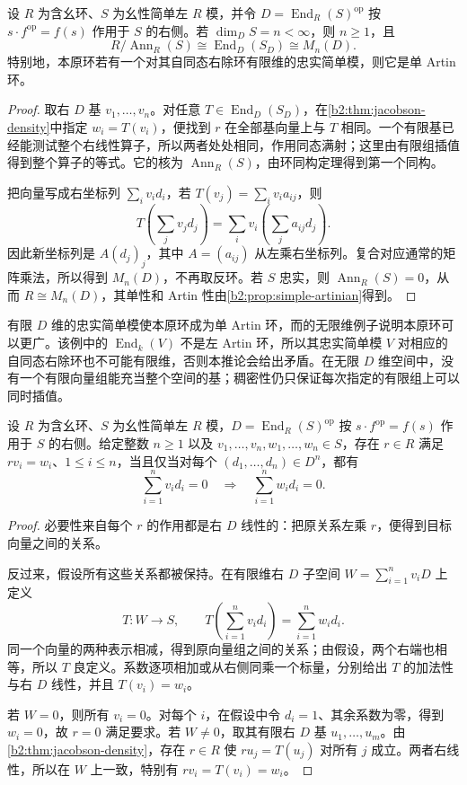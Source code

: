 \begin{corollary}\label{b2:cor:density-finite-dimensional}
	设 \(R\) 为含幺环、\(S\) 为幺性简单左 \(R\) 模，并令 \(D=\operatorname{End}_R(S)^{\mathrm{op}}\) 按 \(s\cdot f^{\mathrm{op}}=f(s)\) 作用于 \(S\) 的右侧。若 \(\dim_D S=n<\infty\)，则 \(n\ge1\)，且
	\[
		R/\operatorname{Ann}_R(S)\cong\operatorname{End}_D(S_D)\cong M_n(D).
	\]
	特别地，本原环若有一个对其自同态右除环有限维的忠实简单模，则它是单 Artin 环。
\end{corollary}
\begin{proof}
	取右 \(D\) 基 \(v_1,\ldots,v_n\)。对任意 \(T\in\operatorname{End}_D(S_D)\)，在\cref{b2:thm:jacobson-density}中指定 \(w_i=T(v_i)\)，便找到 \(r\) 在全部基向量上与 \(T\) 相同。一个有限基已经能测试整个右线性算子，所以两者处处相同，作用同态满射；这里由有限组插值得到整个算子的等式。它的核为 \(\operatorname{Ann}_R(S)\)，由环同构定理得到第一个同构。

	把向量写成右坐标列 \(\sum_i v_i d_i\)，若 \(T(v_j)=\sum_i v_i a_{ij}\)，则
	\[
		T\left(\sum_jv_jd_j\right) =\sum_iv_i\left(\sum_ja_{ij}d_j\right).
	\]
	因此新坐标列是 \(A(d_j)_j\)，其中 \(A=(a_{ij})\) 从左乘右坐标列。复合对应通常的矩阵乘法，所以得到 \(M_n(D)\)，不再取反环。若 \(S\) 忠实，则 \(\operatorname{Ann}_R(S)=0\)，从而 \(R\cong M_n(D)\)，其单性和 Artin 性由\cref{b2:prop:simple-artinian}得到。
\end{proof}

有限 \(D\) 维的忠实简单模使本原环成为单 Artin 环，而的无限维例子说明本原环可以更广。该例中的 \(\operatorname{End}_k(V)\) 不是左 Artin 环，所以其忠实简单模 \(V\) 对相应的自同态右除环也不可能有限维，否则本推论会给出矛盾。在无限 \(D\) 维空间中，没有一个有限向量组能充当整个空间的基；稠密性仍只保证每次指定的有限组上可以同时插值。

\begin{corollary}\label{b2:cor:density-compatible-relations}
	设 \(R\) 为含幺环、\(S\) 为幺性简单左 \(R\) 模，\(D=\operatorname{End}_R(S)^{\mathrm{op}}\) 按 \(s\cdot f^{\mathrm{op}}=f(s)\) 作用于 \(S\) 的右侧。给定整数 \(n\ge1\) 以及 \(v_1,\ldots,v_n,w_1,\ldots,w_n\in S\)，存在 \(r\in R\) 满足 \(rv_i=w_i\)、\(1\le i\le n\)，当且仅当对每个 \((d_1,\ldots,d_n)\in D^n\)，都有
	\[
		\sum_{i=1}^n v_i d_i=0 \quad\Longrightarrow\quad \sum_{i=1}^n w_i d_i=0.
	\]
\end{corollary}
\begin{proof}
	必要性来自每个 \(r\) 的作用都是右 \(D\) 线性的：把原关系左乘 \(r\)，便得到目标向量之间的关系。

	反过来，假设所有这些关系都被保持。在有限维右 \(D\) 子空间 \(W=\sum_{i=1}^n v_iD\) 上定义
	\[
		T:W\longrightarrow S,\qquad T\left(\sum_{i=1}^n v_i d_i\right)=\sum_{i=1}^n w_i d_i.
	\]
	同一个向量的两种表示相减，得到原向量组之间的关系；由假设，两个右端也相等，所以 \(T\) 良定义。系数逐项相加或从右侧同乘一个标量，分别给出 \(T\) 的加法性与右 \(D\) 线性，并且 \(T(v_i)=w_i\)。

	若 \(W=0\)，则所有 \(v_i=0\)。对每个 \(i\)，在假设中令 \(d_i=1\)、其余系数为零，得到 \(w_i=0\)，故 \(r=0\) 满足要求。若 \(W\ne0\)，取其有限右 \(D\) 基 \(u_1,\ldots,u_m\)。由\cref{b2:thm:jacobson-density}，存在 \(r\in R\) 使 \(ru_j=T(u_j)\) 对所有 \(j\) 成立。两者右线性，所以在 \(W\) 上一致，特别有 \(rv_i=T(v_i)=w_i\)。
\end{proof}
